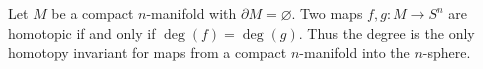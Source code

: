 Let $M$ be a compact $n$-manifold with $\partial M = \varnothing$. Two maps $f, g: M \to S^n$ are homotopic if and only if $\deg(f) = \deg(g)$. Thus the degree is the only homotopy invariant for maps from a compact $n$-manifold into the $n$-sphere.
